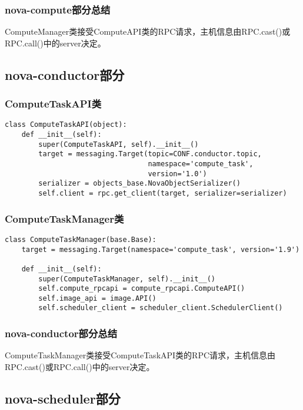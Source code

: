 \documentclass[a4paper,left=2.5cm,right=2.5cm,11pt]{article}
\begin{document}
\subsubsection{nova-compute部分总结}
    ComputeManager类接受ComputeAPI类的RPC请求，主机信息由RPC.cast()或RPC.call()中的server决定。

\subsection{nova-conductor部分}
\subsubsection{ComputeTaskAPI类}
    \begin{lstlisting}
class ComputeTaskAPI(object):
    def __init__(self):
        super(ComputeTaskAPI, self).__init__()
        target = messaging.Target(topic=CONF.conductor.topic,
                                  namespace='compute_task',
                                  version='1.0')
        serializer = objects_base.NovaObjectSerializer()
        self.client = rpc.get_client(target, serializer=serializer)
    \end{lstlisting}
\subsubsection{ComputeTaskManager类}
    \begin{lstlisting}
class ComputeTaskManager(base.Base):
    target = messaging.Target(namespace='compute_task', version='1.9')

    def __init__(self):
        super(ComputeTaskManager, self).__init__()
        self.compute_rpcapi = compute_rpcapi.ComputeAPI()
        self.image_api = image.API()
        self.scheduler_client = scheduler_client.SchedulerClient()
    \end{lstlisting}

\subsubsection{nova-conductor部分总结}
    ComputeTaskManager类接受ComputeTaskAPI类的RPC请求，主机信息由RPC.cast()或RPC.call()中的server决定。

\subsection{nova-scheduler部分}
\end{document}
